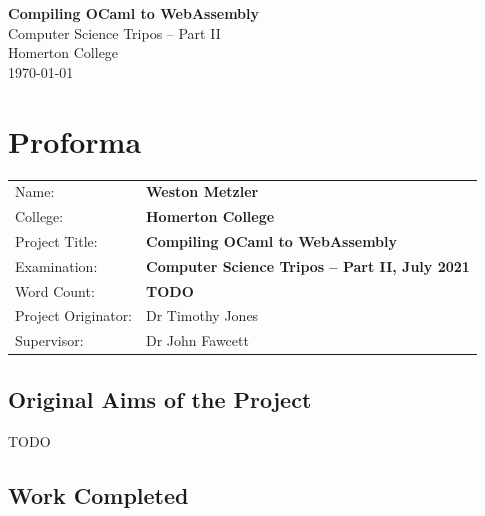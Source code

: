 \documentclass[12pt,a4paper,twoside,openright]{report}
\begin{document}





\pagestyle{empty}


\vspace*{60mm}
\begin{center}
\Huge
\textbf{Compiling OCaml to WebAssembly} \\[5mm]
Computer Science Tripos -- Part II \\[5mm]
Homerton College \\[5mm]
\today  %
\end{center}


\pagestyle{plain}

\chapter*{Proforma}

{\large
\begin{tabular}{ll}
Name:               & \bf Weston Metzler                       \\
College:            & \bf Homerton College                      \\
Project Title:      & \bf Compiling OCaml to WebAssembly         \\
Examination:        & \bf Computer Science Tripos -- Part II, July 2021  \\
Word Count:         & \bf TODO \\
Project Originator: & Dr Timothy Jones                    \\
Supervisor:         & Dr John Fawcett                    \\
\end{tabular}
}

\section*{Original Aims of the Project}

TODO

\section*{Work Completed}
\end{document}
